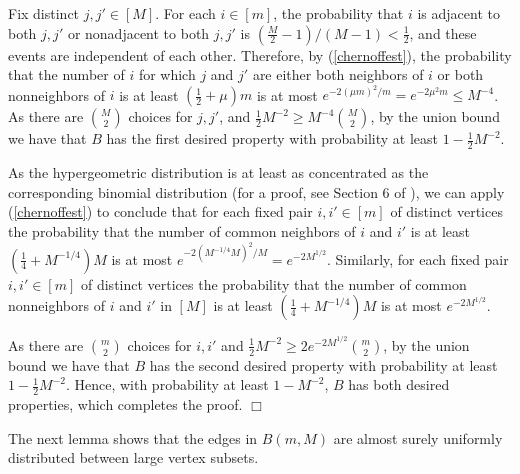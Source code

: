 \documentclass[11pt]{article}
\newenvironment{proof}
      {\medskip\noindent{\bf Proof:}\hspace{1mm}}
      {\hfill$\Box$\medskip}
\begin{document}
\begin{proof}
Fix distinct $j,j' \in [M]$. For each $i \in [m]$, the probability that $i$ is
adjacent to both $j,j'$ or nonadjacent to both $j,j'$ is
$(\frac{M}{2}-1)/(M-1)<\frac{1}{2}$, and these events are independent of each
other. Therefore,
by (\ref{chernoffest}), the probability that the number of $i$ for which $j$
and $j'$ are either both neighbors of $i$ or both nonneighbors of $i$ is at
least $(\frac{1}{2}+\mu)m$ is at most $e^{-2(\mu m)^2/m}=e^{-2\mu^2 m} \leq
M^{-4}$. As there are $\binom{M}{2}$ choices for $j,j'$, and $\frac{1}{2}
M^{-2} \geq
M^{-4}\binom{M}{2}$, by the union bound we have that $B$ has the first desired
property
with probability at least $1-\frac{1}{2}M^{-2}$.

As the hypergeometric distribution is at least as concentrated as the corresponding binomial
distribution (for a proof, see Section 6 of \cite{Ho}), we can apply
(\ref{chernoffest}) to conclude that
for each fixed pair $i,i' \in [m]$ of distinct vertices the probability that
the number of common neighbors of  $i$ and $i'$  is at least
$\left(\frac{1}{4}+M^{-1/4}\right)M$ is at most
$e^{-2(M^{-1/4}M)^2/M}=e^{-2M^{1/2}}$. Similarly, for each fixed pair $i,i'
\in [m]$ of distinct vertices the probability that the number of common
nonneighbors of  $i$ and $i'$ in $[M]$ is at least
$\left(\frac{1}{4}+M^{-1/4}\right)M$ is at most $e^{-2M^{1/2}}$.

As there are ${m \choose 2}$ choices for $i,i'$ and $\frac{1}{2}M^{-2} \geq
2e^{-2M^{1/2}}{m \choose 2}$, by the union bound we have that $B$ has the
second desired property with probability at least $1-\frac{1}{2}M^{-2}$. Hence,
with probability at least $1-M^{-2}$, $B$ has both desired properties, which
completes the proof.
\end{proof}

The next lemma shows that the edges in $B(m,M)$ are almost surely uniformly
distributed between large vertex subsets.
\end{document}
